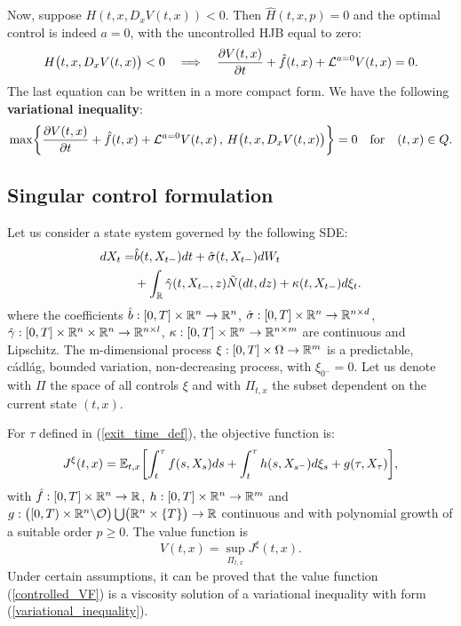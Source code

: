 Now, suppose $H(t,x,D_x V(t,x)) < 0$. Then $\hat H(t,x,p)=0$ and the optimal control is indeed $a=0$, with the uncontrolled HJB equal to zero:
\begin{equation}
 H\bigl( t,x, D_x V(t,x) \bigr) < 0 \quad \Longrightarrow \quad  \frac{\partial V(t,x)}{\partial t} + \hat f(t,x) + \mathcal{L}^{a=0}V(t,x) = 0.
\end{equation}
The last equation can be written in a more compact form. We have the following \textbf{variational inequality}:
\begin{equation}\label{variational_inequality}
 \max \biggl\{ \frac{\partial V(t,x)}{\partial t} + \hat f(t,x) + \mathcal{L}^{a=0}V(t,x) \,,\, H\bigl( t,x, D_x V(t,x) \bigr) \biggr \} =0 \quad \mbox{for} \quad (t,x)\in Q. 
\end{equation}

\subsection{Singular control formulation}\label{singular_sec2}

Let us consider a state system governed by the following SDE:
\begin{align}\label{singular_SDE}
 dX_t =& \hat b(t,X_{t-}) dt + \hat \sigma (t,X_{t-}) dW_t \\ \nonumber
      &+ \int_{\mathbb{R}} \hat \gamma(t,X_{t-},z) \tilde N(dt,dz) + \kappa(t,X_{t-}) d\xi_t .
\end{align} 
where the coefficients 
$\hat b: [0,T]\times \mathbb{R}^n \to \mathbb{R}^n$, $\hat \sigma: [0,T]\times \mathbb{R}^n \to \mathbb{R}^{n \times d}$, 
$\hat \gamma: [0,T]\times \mathbb{R}^n \times \mathbb{R}^n \to \mathbb{R}^{n \times l}$, $\kappa : [0,T] \times \mathbb{R}^n \to \mathbb{R}^{n \times m}$
are continuous and Lipschitz.
The m-dimensional process $\xi : [0,T] \times \Omega \to \mathbb{R}^m$ is a predictable, cádlág, bounded variation, 
non-decreasing process, with $\xi_{0^-} = 0$. Let us denote with $\Pi$ the space of all controls $\xi$ and with $\Pi_{t,x}$ the subset dependent on the current state $(t,x)$.   

For $\tau$ defined in (\ref{exit_time_def}), the objective function is:
\begin{equation}\label{singular_cost_functional}
 J^{\xi}(t,x) = \mathbb{E}_{t,x} \biggl[ \int_t^{\tau} f(s,X_s) ds + \int_t^{\tau} h(s,X_{s^-}) d\xi_s + g(\tau, X_{\tau}) \biggr], 
\end{equation}
with $\hat f:[0,T]\times \mathbb{R}^n \to \mathbb{R}$, $h: [0,T] \times \mathbb{R}^n \to \mathbb{R}^{m}$ 
and $g: \bigl( [0,T)\times \mathbb{R}^n \backslash \mathcal{O} \bigr) \bigcup \bigl( \mathbb{R}^n \times \{T\} \bigr) \to \mathbb{R}$ continuous and with polynomial growth of a suitable order $p\geq0$.
The value function is
\begin{equation}\label{controlled_VF}
 V(t,x) = \sup_{\Pi_{t,x}} J^{\xi}(t,x).
\end{equation}
Under certain assumptions, it can be proved that the value function (\ref{controlled_VF}) is a viscosity solution of a variational inequality 
with form (\ref{variational_inequality}).

